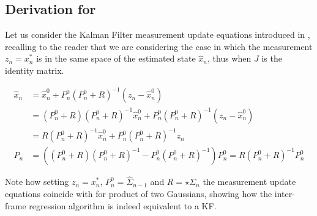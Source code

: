 

\subsection{Derivation for }
\label{app:proof-kalman}
Let us consider the Kalman Filter measurement update equations introduced in , recalling to the reader that we are considering the case in which the measurement $z_n = x_n^*$ is in the same space of the estimated state $\hat{x}_n$, thus when $J$ is the identity matrix.
% 
\begin{small}
\begin{align*}
\hat{x}_n 
&= \hat{x}_n^0 + P_n^0  (P_n^0 + R)^{-1}(z_n - \hat{x}_n^0) \\
&= (P_n^0 + R)(P_n^0 + R)^{-1}\hat{x}_n^0 + P_n^0  (P_n^0 + R)^{-1}(z_n - \hat{x}_n^0) \\
&= R(P_n^0 + R)^{-1}\hat{x}_n^0 + P_n^0  (P_n^0 + R)^{-1}z_n \\
% 
% 
P_n &= ((P_n^0 + R) (P_n^0 + R)^{-1} - P_n^0  (P_n^0 + R)^{-1}) P_n^0 = R (P_n^0 + R)^{-1} P_n^0
\end{align*}
\end{small}
% 
Note how setting $z_n = x_n^*$, $P_n^0 = \hat{\Sigma}_{n - 1}$ and $R = \star\Sigma_{n}$ the measurement update equations coincide with  for product of two Gaussians, showing how the inter-frame regression algorithm is indeed equivalent to a KF.

